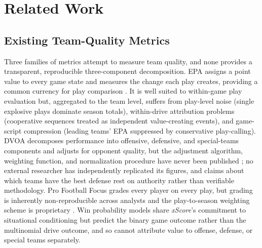 \documentclass[12pt,a4paper]{article}
\newcommand{\xscore}{\textit{xScore}}
\begin{document}
\section{Related Work}
\label{sec:related-work}

\subsection{Existing Team-Quality Metrics}
\label{sec:existing-metrics}

Three families of metrics attempt to measure team quality, and none provides a transparent, reproducible three-component decomposition. EPA assigns a point value to every game state and measures the change each play creates, providing a common currency for play comparison \citep{carter1971operations, carl2021nflfastr}. It is well suited to within-game play evaluation but, aggregated to the team level, suffers from play-level noise (single explosive plays dominate season totals), within-drive attribution problems (cooperative sequences treated as independent value-creating events), and game-script compression (leading teams' EPA suppressed by conservative play-calling). DVOA decomposes performance into offensive, defensive, and special-teams components and adjusts for opponent quality, but the adjustment algorithm, weighting function, and normalization procedure have never been published \citep{schatz2005dvoa}; no external researcher has independently replicated its figures, and claims about which teams have the best defense rest on authority rather than verifiable methodology. Pro Football Focus grades every player on every play, but grading is inherently non-reproducible across analysts and the play-to-season weighting scheme is proprietary \citep{pff2014grades}. Win probability models \citep{stern1991probability, lock2014randomforests} share \xscore{}'s commitment to situational conditioning but predict the binary game outcome rather than the multinomial drive outcome, and so cannot attribute value to offense, defense, or special teams separately.
\end{document}
